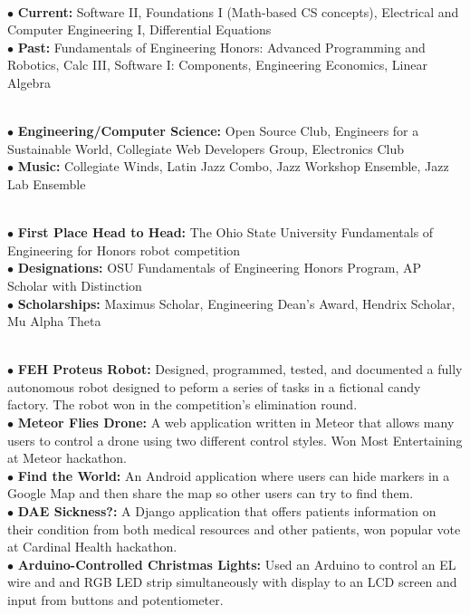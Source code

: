 \documentclass[10pt]{article}
\begin{document}
\\
\smallskip
$\bullet$ {\bf Current:} Software II, Foundations I (Math-based CS concepts), Electrical and Computer Engineering I, Differential Equations\\
$\bullet$ {\bf Past:} Fundamentals of Engineering Honors: Advanced Programming and Robotics, Calc III, Software I: Components, Engineering Economics, Linear Algebra
\medskip

\\
\smallskip
$\bullet$ {\bf Engineering/Computer Science:} Open Source Club, Engineers for a Sustainable World, Collegiate Web Developers Group, Electronics Club\\
$\bullet$ {\bf Music:} Collegiate Winds, Latin Jazz Combo, Jazz Workshop Ensemble, Jazz Lab Ensemble
\medskip

\\
\smallskip
$\bullet$ {\bf First Place Head to Head:} The Ohio State University Fundamentals of Engineering for Honors robot competition\\
$\bullet$ {\bf Designations:} OSU Fundamentals of Engineering Honors Program, AP Scholar with Distinction\\
$\bullet$ {\bf Scholarships:} Maximus Scholar, Engineering Dean's Award, Hendrix Scholar, Mu Alpha Theta
\medskip

\\
\smallskip
$\bullet$ {\bf FEH Proteus Robot:} Designed, programmed, tested, and documented a fully autonomous robot designed to peform a series of tasks in a fictional candy factory. The robot won in the competition's elimination round.\\
$\bullet$ {\bf Meteor Flies Drone:} A web application written in Meteor that allows many users to control a drone using two different control styles. Won Most Entertaining at Meteor hackathon.\\
$\bullet$ {\bf Find the World:} An Android application where users can hide markers in a Google Map and then share the map so other users can try to find them.\\
$\bullet$ {\bf DAE Sickness?:} A Django application that offers patients information on their condition from both medical resources and other patients, won popular vote at Cardinal Health hackathon.\\
$\bullet$ {\bf Arduino-Controlled Christmas Lights:} Used an Arduino to control an EL wire and and RGB LED strip simultaneously with display to an LCD screen and input from buttons and potentiometer.
\medskip
\end{document}
